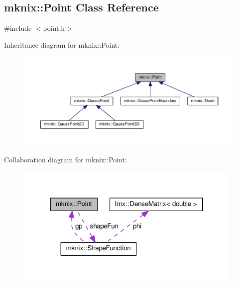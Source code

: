 \hypertarget{classmknix_1_1_point}{}\subsection{mknix\+:\+:Point Class Reference}
\label{classmknix_1_1_point}


{\ttfamily \#include $<$point.\+h$>$}



Inheritance diagram for mknix\+:\+:Point\+:\nopagebreak
\begin{figure}[H]
\begin{center}
\leavevmode
\includegraphics[width=350pt]{d1/d48/classmknix_1_1_point__inherit__graph}
\end{center}
\end{figure}


Collaboration diagram for mknix\+:\+:Point\+:\nopagebreak
\begin{figure}[H]
\begin{center}
\leavevmode
\includegraphics[width=310pt]{d6/d9a/classmknix_1_1_point__coll__graph}
\end{center}
\end{figure}
